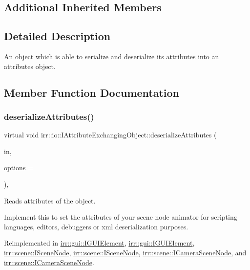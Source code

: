 \subsection*{Additional Inherited Members}


\subsection{Detailed Description}
An object which is able to serialize and deserialize its attributes into an attributes object. 

\subsection{Member Function Documentation}
\mbox{\label{classirr_1_1io_1_1IAttributeExchangingObject_a013d4ead3736d7fab4bc18c2d61a3e2e}} 
\subsubsection{\texorpdfstring{deserialize\+Attributes()}{deserializeAttributes()}\hspace{0.1cm}{\footnotesize\ttfamily [1/2]}}
{\footnotesize\ttfamily virtual void irr\+::io\+::\+I\+Attribute\+Exchanging\+Object\+::deserialize\+Attributes (\begin{DoxyParamCaption}\item[{\hyperlink{classirr_1_1io_1_1IAttributes}{io\+::\+I\+Attributes} $\ast$}]{in,  }\item[{\hyperlink{structirr_1_1io_1_1SAttributeReadWriteOptions}{io\+::\+S\+Attribute\+Read\+Write\+Options} $\ast$}]{options = {} }\end{DoxyParamCaption})\hspace{0.3cm}{\ttfamily [inline]}, {\ttfamily [virtual]}}



Reads attributes of the object. 

Implement this to set the attributes of your scene node animator for scripting languages, editors, debuggers or xml deserialization purposes. 

Reimplemented in \hyperlink{classirr_1_1gui_1_1IGUIElement_af71b96163b8d95816cd9c80fbf413b4d}{irr\+::gui\+::\+I\+G\+U\+I\+Element}, \hyperlink{classirr_1_1gui_1_1IGUIElement_af71b96163b8d95816cd9c80fbf413b4d}{irr\+::gui\+::\+I\+G\+U\+I\+Element}, \hyperlink{classirr_1_1scene_1_1ISceneNode_a5fb609b08fc89a92f928c19ce3b181eb}{irr\+::scene\+::\+I\+Scene\+Node}, \hyperlink{classirr_1_1scene_1_1ISceneNode_a5fb609b08fc89a92f928c19ce3b181eb}{irr\+::scene\+::\+I\+Scene\+Node}, \hyperlink{classirr_1_1scene_1_1ICameraSceneNode_a0df881cb5e2a55562399281061151ae8}{irr\+::scene\+::\+I\+Camera\+Scene\+Node}, and \hyperlink{classirr_1_1scene_1_1ICameraSceneNode_a0df881cb5e2a55562399281061151ae8}{irr\+::scene\+::\+I\+Camera\+Scene\+Node}.

